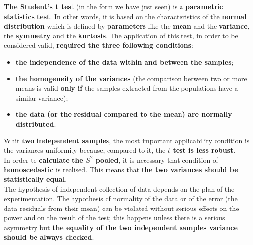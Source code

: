 \begin{frame}
  \vspace*{.25cm}
   \textbf{The Student's t test} (in the form we have just seen) is a \textbf{parametric statistics test}. In other words, it is based on the characteristics of the \textbf{normal distribution} which is defined by \textbf{parameters} like the \textbf{mean} and the \textbf{variance}, the \textbf{symmetry} and the \textbf{kurtosis}. The application of this test, in order to be considered valid, \textbf{required the three following conditions}:
  \vspace*{.35cm}
  \begin{itemize}
    \item  \textbf{the independence of the data within and between the samples};
    \vspace*{.25cm}
    \item  \textbf{the homogeneity of the variances} (the comparison between two or more means is valid \textbf{only if} the samples extracted from the populations have a similar variance);
    \vspace*{.25cm}
    \item \textbf{the data (or the residual compared to the mean) are normally distributed}.
  \end{itemize}
\end{frame}

\begin{frame}
  \vspace*{.25cm}
  Whit \textbf{two independent samples}, the most important applicability condition is the variances uniformity because, compared to it, the \textbf{$ t $ test is less robust}.\\
  \vspace*{.25cm}
  In order to  \textbf{calculate the \boldmath$ S^2 $ pooled}, it is necessary that condition of \textbf{homoscedastic} is realised. This means that \textbf{the two variances should be statistically equal}.\\
  \vspace*{.25cm}
  The hypothesis of independent collection of data depends on the plan  of the experimentation. The hypothesis of normality of the data or of the error (the data residuals from their mean) can be violated without serious effects on the power and on the result of the test; this happens unless there is a serious asymmetry but \textbf{the equality of the two independent samples variance should be always checked}.
\end{frame}

